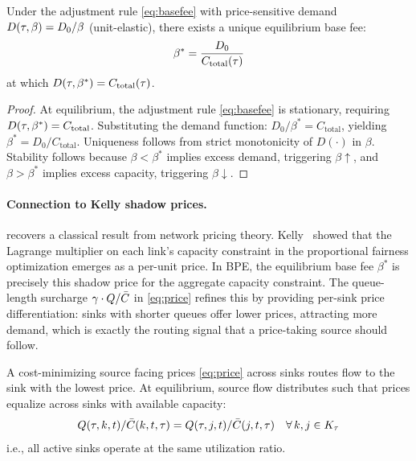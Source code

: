\begin{proposition}
\label{prop:price-eq}
Under the adjustment rule \eqref{eq:basefee} with price-sensitive demand
$D(\tau, \beta) = D_0 / \beta$ (unit-elastic), there exists a unique
equilibrium base fee:
\begin{equation}
\beta^* = \frac{D_0}{C_{\text{total}}(\tau)}
\end{equation}
at which $D(\tau, \beta^*) = C_{\text{total}}(\tau)$.
\end{proposition}

\begin{proof}
At equilibrium, the adjustment rule \eqref{eq:basefee} is stationary, requiring
$D(\tau, \beta^*) = C_{\text{total}}$. Substituting the demand function:
$D_0 / \beta^* = C_{\text{total}}$, yielding
$\beta^* = D_0 / C_{\text{total}}$. Uniqueness follows from
strict monotonicity of $D(\cdot)$ in $\beta$. Stability follows because
$\beta < \beta^*$ implies excess demand, triggering $\beta \uparrow$,
and $\beta > \beta^*$ implies excess capacity, triggering $\beta \downarrow$.
\end{proof}

\paragraph{Connection to Kelly shadow prices.}
 recovers a classical result from network pricing theory.
Kelly~\cite{kelly1998rate} showed that the Lagrange multiplier on each link's
capacity constraint in the proportional fairness optimization emerges as a
per-unit price. In BPE, the equilibrium base fee $\beta^*$ is precisely this
shadow price for the aggregate capacity constraint. The queue-length surcharge
$\gamma \cdot Q/\bar{C}$ in \eqref{eq:price} refines this by providing
per-sink price differentiation: sinks with shorter queues offer lower prices,
attracting more demand, which is exactly the routing signal that a
price-taking source should follow.

\begin{proposition}
\label{prop:routing}
A cost-minimizing source facing prices \eqref{eq:price} across sinks routes
flow to the sink with the lowest price. At equilibrium, source flow distributes
such that prices equalize across sinks with available capacity:
\begin{equation}
Q(\tau, k, t) / \bar{C}(k, t, \tau) = Q(\tau, j, t) / \bar{C}(j, t, \tau)
\quad \forall\, k, j \in K_\tau
\end{equation}
i.e., all active sinks operate at the same utilization ratio.
\end{proposition}


